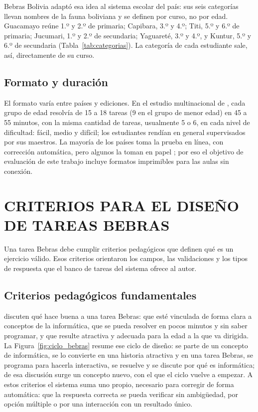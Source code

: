 Bebras Bolivia adaptó esa idea al sistema escolar del país: sus seis categorías llevan nombres de la fauna boliviana y se definen por curso, no por edad. Guacamayo reúne 1.º y 2.º de primaria; Capibara, 3.º y 4.º; Titi, 5.º y 6.º de primaria; Jucumari, 1.º y 2.º de secundaria; Yaguareté, 3.º y 4.º, y Kuntur, 5.º y 6.º de secundaria (Tabla~\ref{tab:categorias}). La categoría de cada estudiante sale, así, directamente de su curso.

\subsection{Formato y duración}

El formato varía entre países y ediciones. En el estudio multinacional de \textcite[42]{izumirolo2017}, cada grupo de edad resolvía de 15 a 18 tareas (9 en el grupo de menor edad) en 45 a 55 minutos, con la misma cantidad de tareas, usualmente 5 o 6, en cada nivel de dificultad: fácil, medio y difícil; los estudiantes rendían en general supervisados por sus maestros. La mayoría de los países toma la prueba en línea, con corrección automática, pero algunos la toman en papel \parencite{bebrasstats2024}; por eso el objetivo de evaluación de este trabajo incluye formatos imprimibles para las aulas sin conexión.

\section{CRITERIOS PARA EL DISEÑO DE TAREAS BEBRAS}

Una tarea Bebras debe cumplir criterios pedagógicos que definen qué es un ejercicio válido. Esos criterios orientaron los campos, las validaciones y los tipos de respuesta que el banco de tareas del sistema ofrece al autor.

\subsection{Criterios pedagógicos fundamentales}

\textcite{dagienefutschek2008} discuten qué hace buena a una tarea Bebras: que esté vinculada de forma clara a conceptos de la informática, que se pueda resolver en pocos minutos y sin saber programar, y que resulte atractiva y adecuada para la edad a la que va dirigida. La Figura~\ref{fig:ciclo_bebras} resume ese ciclo de diseño: se parte de un concepto de informática, se lo convierte en una historia atractiva y en una tarea Bebras, se programa para hacerla interactiva, se resuelve y se discute por qué es informática; de esa discusión surge un concepto nuevo, con el que el ciclo vuelve a empezar. A estos criterios el sistema suma uno propio, necesario para corregir de forma automática: que la respuesta correcta se pueda verificar sin ambigüedad, por opción múltiple o por una interacción con un resultado único.

